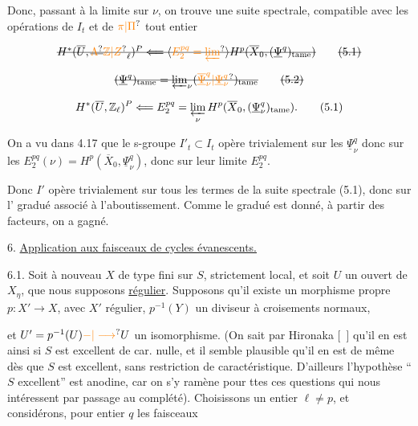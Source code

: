 Donc, passant à la limite sur $\nu$, on trouve une suite spectrale, compatible avec les opérations de $I_t$ et  de $\unsure{\pi|\Pi}$ tout entier

\[
\deleted{H^*(\overline U,\deleted{\unsure{\Lambda}}\unsure{\mathbb{Z}|Z}_\ell)^P\Longleftarrow\inserted{\unsure{E_2^{pq}=\varprojlim}}H^p(\overline X_0,(\underline{\Psi}^q)_{\mathrm{tame}})}
\tag*{\deleted{(5.1)}}
\]

\[
\deleted{(\underline{\Psi}^q)_{\mathrm{tame}}=\varprojlim_\nu(\unsure{\overline{\underline{\Psi}}_\nu^q|\underline{\Psi}_\nu^q})_{\mathrm{tame}}}
\tag*{\deleted{(5.2)}}
\]

\[
H^*(\overline U,\mathbb{Z}_\ell)^P\Longleftarrow E_2^{pq}=\varprojlim_\nu H^p(\overline X_0,(\underline{\Psi}_\nu^q)_{\mathrm{tame}}).
\tag*{(5.1)}
\]

On a vu dans 4.17 que le s-groupe $I'_t\subset I_t$ opère trivialement sur les $\underline{\Psi}_\nu^q$ donc  sur les $E_2^{pq}(\nu)=H^p(\overline X_0,\underline{\Psi}_\nu^q)$, donc sur leur limite $E_2^{pq}$.

Donc $I'$ opère trivialement sur tous les termes de la suite spectrale (5.1), donc sur l' gradué associé à l'aboutissement. Comme le  gradué est donné,  à partir des facteurs, on a gagné.


6. \uline{Application aux faisceaux de cycles évanescents.}

6.1. Soit à nouveau $X$ de type fini sur $S$,  strictement local, et soit $U$ un ouvert de $X_\eta$, que nous supposons \uline{régulier}.  Supposons qu'il existe un morphisme propre $p:X'\to X$,  avec $X'$ régulier, $p^{-1}(Y)$ un diviseur à croisements normaux,


et $U'=p^{-1}(U)\unsure{{-}|\longrightarrow}U$ un isomorphisme. (On sait par Hironaka [\ ] qu'il en est ainsi si $S$ est excellent de car. nulle, et  il semble plausible qu'il en est de même dès que $S$ est excellent, sans restriction de caractéristique. D'ailleurs l'hypothèse ``$S$ excellent'' est anodine, car on s'y ramène pour ttes ces questions qui nous intéressent par passage au complété).  Choisissons un entier $\ell\ne p$, et considérons, pour  entier $q$  les faisceaux

